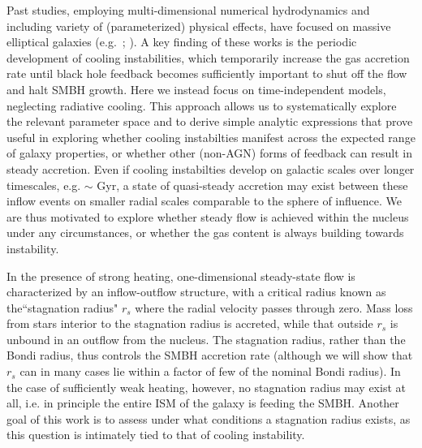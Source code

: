 \documentclass[usenatbib,fleqn]{mn2e}
\newcommand{\rs}{r_s}
\begin{document}
Past studies, employing multi-dimensional numerical hydrodynamics and
including variety of (parameterized) physical effects, have focused on
massive elliptical galaxies (e.g.~\citealt{Ciotti&Ostriker07};
\citealt{Ciotti+10}).  A key finding of these works is the periodic
development of cooling instabilities, which temporarily increase the
gas accretion rate until black hole feedback becomes sufficiently
important to shut off the flow and halt SMBH growth.  Here we instead
focus on time-independent models, neglecting radiative cooling.  This
approach allows us to systematically explore the relevant parameter
space and to derive simple analytic expressions that prove useful in
exploring whether cooling instabilties manifest across the expected
range of galaxy properties, or whether other (non-AGN) forms of
feedback can result in steady accretion.  Even if cooling instabilties
develop on galactic scales over longer timescales, e.g. $\sim$ Gyr, a
state of quasi-steady accretion may exist between these inflow events
on smaller radial scales comparable to the sphere of influence.  We
are thus motivated to explore whether steady flow is achieved within
the nucleus under any circumstances, or whether the gas content is
always building towards instability.

In the presence of strong heating, one-dimensional steady-state flow
is characterized by an inflow-outflow structure, with a critical
radius known as the``stagnation radius" $\rs$ where the radial
velocity passes through zero.  Mass loss from stars interior to the
stagnation radius is accreted, while that outside $\rs$ is unbound in
an outflow from the nucleus.  The stagnation radius, rather than the
Bondi radius, thus controls the SMBH accretion rate (although we will
show that $\rs$ can in many cases lie within a factor of few of the
nominal Bondi radius).  In the case of sufficiently weak heating,
however, no stagnation radius may exist at all, i.e. in principle the entire ISM of
the galaxy is feeding the SMBH.  Another goal of this work is to
assess under what conditions a stagnation radius exists, as this
question is intimately tied to that of cooling instability.
\end{document}
